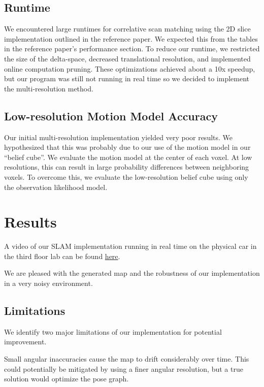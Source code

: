 \documentclass[11pt]{article}
\begin{document}
\subsection{Runtime}

We encountered large runtimes for correlative scan matching using the 2D slice
implementation outlined in the reference paper. We expected this from the tables
in the reference paper's performance section. To reduce our runtime, we
restricted the size of the delta-space, decreased translational resolution, and
implemented online computation pruning. These optimizations achieved about a 10x
speedup, but our program was still not running in real time so we decided to
implement the multi-resolution method.

\subsection{Low-resolution Motion Model Accuracy}

Our initial multi-resolution implementation yielded very poor results. We
hypothesized that this was probably due to our use of the motion model in our
``belief cube''. We evaluate the motion model at the center of each voxel. At
low resolutions, this can result in large probability differences between
neighboring voxels. To overcome this, we evaluate the low-resolution belief cube
using only the observation likelihood model.

\section{Results}

A video of our SLAM implementation running in real time on the physical car
in the third floor lab can be found
\href{https://drive.google.com/file/d/1FmnGZFJqioL2wlWBa6Be1aau3Tv777Bp/view?usp=sharing}{here}.

\bigskip
\noindent
We are pleased with the generated map and the robustness of our implementation
in a very noisy environment.

\subsection{Limitations}

We identify two major limitations of our implementation for potential improvement.

\bigskip
\noindent
Small angular inaccuracies cause the map to drift considerably over time. This
could potentially be mitigated by using a finer angular resolution, but a true
solution would optimize the pose graph.
\end{document}
